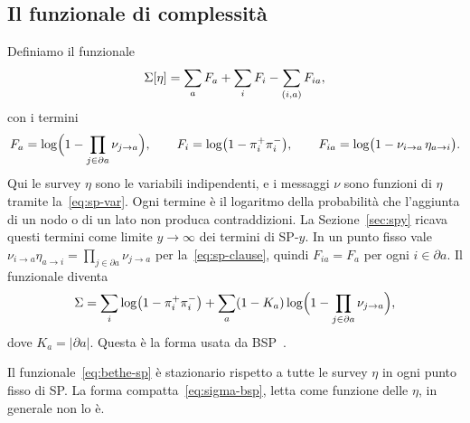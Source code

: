 \subsection{Il funzionale di complessità}

Definiamo il funzionale
\begin{equation}
\Sigma[\eta]=\sum_a F_a+\sum_i F_i-\sum_{(i,a)}F_{ia},
\label{eq:bethe-sp}
\end{equation}
con i termini
\begin{equation}
F_a=\log\Bigl(1-\prod_{j\in\partial a}\nu_{j\to a}\Bigr),\qquad
F_i=\log\bigl(1-\pi_i^+\pi_i^-\bigr),\qquad
F_{ia}=\log\bigl(1-\nu_{i\to a}\,\eta_{a\to i}\bigr).
\label{eq:bethe-terms}
\end{equation}
Qui le survey $\eta$ sono le variabili indipendenti, e i messaggi $\nu$ sono funzioni di $\eta$ tramite la~\eqref{eq:sp-var}.
Ogni termine è il logaritmo della probabilità che l'aggiunta di un nodo o di un lato non produca contraddizioni.
La Sezione~\ref{sec:spy} ricava questi termini come limite $y\to\infty$ dei termini di SP-$y$.
In un punto fisso vale $\nu_{i\to a}\eta_{a\to i}=\prod_{j\in\partial a}\nu_{j\to a}$ per la~\eqref{eq:sp-clause}, quindi $F_{ia}=F_a$ per ogni $i\in\partial a$.
Il funzionale diventa
\begin{equation}
\Sigma=\sum_i\log\bigl(1-\pi_i^+\pi_i^-\bigr)+\sum_a(1-K_a)\log\Bigl(1-\prod_{j\in\partial a}\nu_{j\to a}\Bigr),
\label{eq:sigma-bsp}
\end{equation}
dove $K_a=|\partial a|$.
Questa è la forma usata da BSP~\citep[eq.~(4)--(5)]{marino2016bsp}.

\begin{lemma}[Stazionarietà]
\label{lem:stationary}
Il funzionale~\eqref{eq:bethe-sp} è stazionario rispetto a tutte le survey $\eta$ in ogni punto fisso di SP.
La forma compatta~\eqref{eq:sigma-bsp}, letta come funzione delle $\eta$, in generale non lo è.
\end{lemma}

